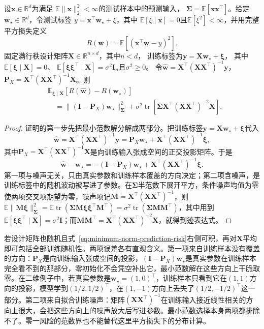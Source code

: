 \begin{theorem}[基于最小范数的回归期望风险]
\label{thm:minimum-norm-risk-decomposition}
设$\bm x\in\mathbb R^d$为满足
$\mathbb E\|\bm x\|_2^2<\infty$的测试样本中的预测输入，
$\bm\Sigma=\mathbb E[\bm x\bm x^\top]$。给定
$\bm w_\star\in\mathbb R^d$，令测试标签
$y=\bm x^\top\bm w_\star+\xi$，其中
$\mathbb E[\xi\mid\bm x]=0$且$\mathbb E[\xi^2]<\infty$，并用完整平方损失定义
\[
 R(\bm w)=\mathbb E[(\bm x^\top\bm w-y)^2].
\]
固定满行秩设计矩阵$\bm X\in\mathbb R^{n\times d}$，其中$n<d$，
训练标签为$\bm y=\bm X\bm w_\star+\bm\xi$，
其中$\mathbb E[\bm\xi\mid\bm X]=0$、
$\mathbb E[\bm\xi\bm\xi^\top\mid\bm X]=\sigma^2\bm I_n$且$\sigma^2\geq0$。
令$\hat{\bm w}=\bm X^\top(\bm X\bm X^\top)^{-1}\bm y$，
$\bm P_X=\bm X^\top(\bm X\bm X^\top)^{-1}\bm X$。则
\begin{equation}
 \begin{aligned}
 &\mathbb E_{\bm\xi\mid\bm X}
       [R(\hat{\bm w})-R(\bm w_\star)]\\
 &\quad=\|(\bm I-\bm P_X)\bm w_\star\|_{\bm\Sigma}^2
 +\sigma^2\operatorname{tr}\left[
 \bm\Sigma\bm X^\top(\bm X\bm X^\top)^{-2}\bm X\right].
 \end{aligned}
 \label{eq:minimum-norm-prediction-risk}
\end{equation}
\end{theorem}
\begin{proof}
证明的第一步先把最小范数解分解成两部分。把训练标签$\bm y=\bm X\bm w_\star+\bm\xi$代入
\[\hat{\bm w}=\bm X^\top(\bm X\bm X^\top)^{-1}\bm y=\bm P_X\bm w_\star+\bm X^\top(\bm X\bm X^\top)^{-1}\bm\xi,
\]
其中$\bm P_X=\bm X^\top(\bm X\bm X^\top)^{-1}\bm X$是向训练输入张成空间的正交投影矩阵。于是
\[\hat{\bm w}-\bm w_\star=-(\bm I-\bm P_X)\bm w_\star+\bm X^\top(\bm X\bm X^\top)^{-1}\bm\xi.
\]
第一项与噪声无关，只由真实参数和训练样本覆盖的方向决定；第二项含噪声，是训练标签中的随机波动被写进了参数。在$\bm\Sigma$半范数下展开平方，条件噪声均值为零使两项交叉项期望为零，噪声项记$\bm M=\bm X^\top(\bm X\bm X^\top)^{-1}$，则$\mathbb E\|\bm M\bm\xi\|_{\bm\Sigma}^2=\mathbb E\operatorname{tr}(\bm\Sigma\bm M\bm\xi\bm\xi^\top\bm M^\top)=\sigma^2\operatorname{tr}(\bm\Sigma\bm M\bm M^\top)$，其中用到$\mathbb E[\bm\xi\bm\xi^\top\mid\bm X]=\sigma^2\bm I$；而$\bm M\bm M^\top=\bm X^\top(\bm X\bm X^\top)^{-2}\bm X$，就得到迹表达式。
\end{proof}

若设计矩阵也随机且式~\eqref{eq:minimum-norm-prediction-risk}右侧可积，再对$\bm X$平均即可包括全部训练随机性。两项误差各有直观含义。第一项来自训练样本没有覆盖的方向：$\bm P_X$是向训练输入张成空间的投影，$(\bm I-\bm P_X)\bm w_\star$是真实参数在训练样本完全看不到的那部分，零初始化不会凭空补出它，最小范数解在这些方向上干脆取零。在二维例子中，若真实参数是$\bm w_\star=(1,0)^\top$，训练样本只看到它在$(1,1)$方向的投影，模型学到$(1/2,1/2)^\top$，在$(1,-1)$方向上丢失了$(1/2,-1/2)^\top$这一部分。第二项来自拟合训练噪声：矩阵$(\bm X\bm X^\top)^{-1}$在训练输入接近线性相关的方向上很大，会把这些方向上的噪声放大后写进参数。最小范数选择本身两项都排除不了。零一风险的范数界也不能替代这里平方损失下的分布计算。

